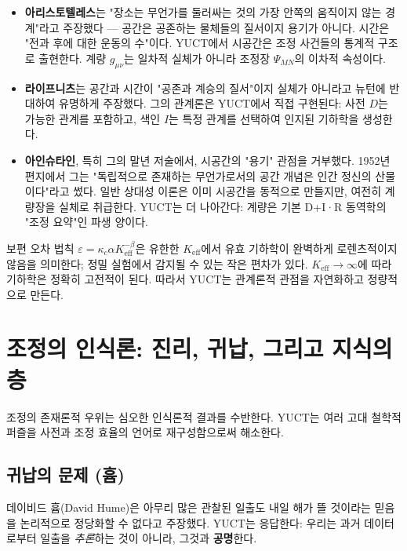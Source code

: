 \documentclass[12pt,a4paper]{article}
\begin{document}
	\begin{itemize}
		\item \textbf{아리스토텔레스}는 "장소는 무언가를 둘러싸는 것의 가장 안쪽의 움직이지 않는 경계"라고 주장했다 — 공간은 공존하는 물체들의 질서이지 용기가 아니다. 시간은 "전과 후에 대한 운동의 수"이다. YUCT에서 시공간은 조정 사건들의 통계적 구조로 출현한다. 계량 \(g_{\mu\nu}\)는 일차적 실체가 아니라 조정장 \(\Psi_{MN}\)의 이차적 속성이다.
		
		\item \textbf{라이프니츠}는 공간과 시간이 "공존과 계승의 질서"이지 실체가 아니라고 뉴턴에 반대하여 유명하게 주장했다. 그의 관계론은 YUCT에서 직접 구현된다: 사전 \(D\)는 가능한 관계를 포함하고, 색인 \(I\)는 특정 관계를 선택하여 인지된 기하학을 생성한다.
		
		\item \textbf{아인슈타인}, 특히 그의 말년 저술에서, 시공간의 "용기" 관점을 거부했다. 1952년 편지에서 그는 "독립적으로 존재하는 무언가로서의 공간 개념은 인간 정신의 산물이다"라고 썼다. 일반 상대성 이론은 이미 시공간을 동적으로 만들지만, 여전히 계량장을 실체로 취급한다. YUCT는 더 나아간다: 계량은 기본 D+I·R 동역학의 "조정 요약"인 파생 양이다.
	\end{itemize}
	
	보편 오차 법칙 \(\varepsilon = \kappa_c \alpha K_{\mathrm{eff}}^{-\beta}\)은 유한한 \(K_{\mathrm{eff}}\)에서 유효 기하학이 완벽하게 로렌츠적이지 않음을 의미한다; 정밀 실험에서 감지될 수 있는 작은 편차가 있다. \(K_{\mathrm{eff}} \to \infty\)에 따라 기하학은 정확히 고전적이 된다. 따라서 YUCT는 관계론적 관점을 자연화하고 정량적으로 만든다.
	
	\section{조정의 인식론: 진리, 귀납, 그리고 지식의 층}
	\label{sec:epistemology}
	
	조정의 존재론적 우위는 심오한 인식론적 결과를 수반한다. YUCT는 여러 고대 철학적 퍼즐을 사전과 조정 효율의 언어로 재구성함으로써 해소한다.
	
	\subsection{귀납의 문제 (흄)}
	
	데이비드 흄(David Hume)은 아무리 많은 관찰된 일출도 내일 해가 뜰 것이라는 믿음을 논리적으로 정당화할 수 없다고 주장했다. YUCT는 응답한다: 우리는 과거 데이터로부터 일출을 \emph{추론}하는 것이 아니라, 그것과 \textbf{공명}한다.
	
\end{document}
